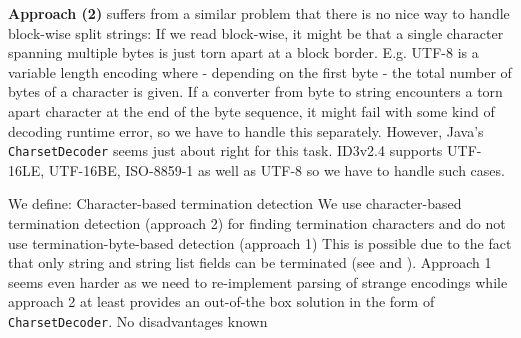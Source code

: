 \textbf{Approach (2)} suffers from a similar problem that there is no nice way to handle block-wise split strings: If we read block-wise, it might be that a single character spanning multiple bytes is just torn apart at a block border. E.g. UTF-8 is a variable length encoding where - depending on the first byte - the total number of bytes of a character is given. If a converter from byte to string encounters a torn apart character at the end of the byte sequence, it might fail with some kind of decoding runtime error, so we have to handle this separately. However, Java's \texttt{CharsetDecoder} seems just about right for this task. ID3v2.4 supports UTF-16LE, UTF-16BE, ISO-8859-1 as well as UTF-8 so we have to handle such cases.

We define:
{%
Character-based termination detection
}
{%
We use character-based termination detection (approach 2) for finding termination characters and do not use termination-byte-based detection (approach 1)
}
{%
This is possible due to the fact that only string and string list fields can be terminated (see  and ). Approach 1 seems even harder as we need to re-implement parsing of strange encodings while approach 2 at least provides an out-of-the box solution in the form of  \texttt{CharsetDecoder}.
}
{%
No disadvantages known
}

